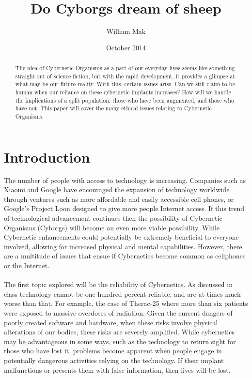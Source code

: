 \documentclass[12pt,a4paper,notitlepage]{article}
\title{Do Cyborgs dream of sheep}
\author{William Mak}
\date{October 2014}
\begin{document}
\maketitle
\begin{abstract}
	The idea of Cybernetic Organisms as a part of our everyday lives seems like
something straight out of science fiction, but with the rapid development, it
provides a glimpse at what may be our future reality. With this, certain issues
arise. Can we still claim to be human when our reliance on these cybernetic
implants increases? How will we handle the implications of a split population:
those who have been augmented, and those who have not. This paper will cover the
many ethical issues relating to Cybernetic Organisms.
\end{abstract}

\section{Introduction}
The number of people with access to technology is increasing. Companies such as
Xiaomi and Google have encouraged the expansion of technology worldwide through
ventures such as more affordable and easily accessible cell phones, or Google's
Project Loon designed to give more people Internet access. If this trend of
technological advancement continues then the possibility of Cybernetic Organisms
(Cyborgs) will become an even more viable possibility. While Cybernetic
enhancements could potentially be extremely beneficial to everyone involved,
allowing for increased physical and mental capabilities. However, there are a
multitude of issues that ensue if Cybernetics become common as cellphones or the
Internet.
\\\\
The first topic explored will be the reliability of Cybernetics. As
discussed in class technology cannot be one hundred percent reliable, and
are at times much worse than that. For example, the case of Therac-25 where
more than six patients were exposed to massive overdoses of radiation.
Given the current dangers of poorly created software and hardware, when
these risks involve physical alterations of our bodies, these risks are
severely amplified. While cybernetics may be advantageous in some ways, such
as the technology to return sight for those who have lost it, problems
become apparent when people engage in potentially dangerous activities
relying on the technology. If their implant malfunctions or presents them
with false information, then lives will be lost.
\end{document}
